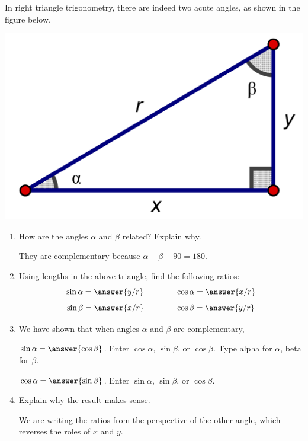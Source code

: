 \documentclass[nooutcomes]{ximera}
\begin{document}
\begin{problem}
In right triangle trigonometry, there are indeed two acute angles, as shown in the figure below.
\begin{image}
\includegraphics[scale=0.8]{rightTriangle2.png}
\end{image}
\begin{enumerate}
\item How are the angles $\alpha$ and $\beta$ related?  Explain why.  \begin{hint}They are complementary because $\alpha+\beta+90=180$.\end{hint}
\item Using lengths in the above triangle, find the following ratios:    
\[
\sin\alpha = \answer{y/r} \qquad\qquad \cos\alpha = \answer{x/r}
\]
\[
\sin\beta = \answer{x/r} \qquad\qquad \cos\beta = \answer{y/r}
\]
\item We have shown that when angles $\alpha$ and $\beta$ are complementary, 

$\sin\alpha=\answer{\cos\beta}$.  \qquad Enter $\cos\alpha$, $\sin\beta$, or $\cos\beta$.  Type alpha for $\alpha$, beta for $\beta$.  

$\cos\alpha =\answer{\sin\beta}$.  \qquad Enter $\sin\alpha$, $\sin\beta$, or $\cos\beta$.  

\item Explain why the result makes sense.  \begin{hint}We are writing the ratios from the perspective of the other angle, which reverses 
the roles of $x$ and $y$.\end{hint}
\end{enumerate}
\end{problem}
\end{document}

